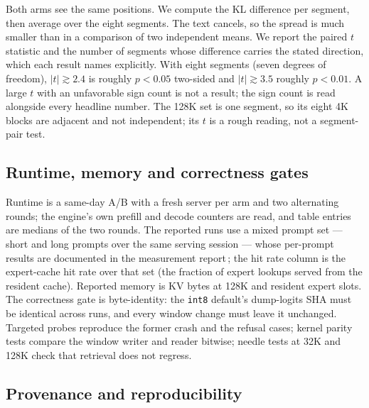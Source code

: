 \documentclass[10pt,twocolumn]{article}
\begin{document}
Both arms see the same positions. We compute the KL difference per segment, then average over the eight segments. The text cancels, so the spread is much smaller than in a comparison of two independent means. We report the paired $t$ statistic and the number of segments whose difference carries the stated direction, which each result names explicitly. With eight segments (seven degrees of freedom), $|t|\gtrsim2.4$ is roughly $p<0.05$ two-sided and $|t|\gtrsim3.5$ roughly $p<0.01$. A large $t$ with an unfavorable sign count is not a result; the sign count is read alongside every headline number. The 128K set is one segment, so its eight 4K blocks are adjacent and not independent; its $t$ is a rough reading, not a segment-pair test.

\subsection{Runtime, memory and correctness gates}

Runtime is a same-day A/B with a fresh server per arm and two alternating rounds; the engine's own prefill and decode counters are read, and table entries are medians of the two rounds. The reported runs use a mixed prompt set --- short and long prompts over the same serving session --- whose per-prompt results are documented in the measurement report\,\cite{strata-wp}; the hit rate column is the expert-cache hit rate over that set (the fraction of expert lookups served from the resident cache). Reported memory is KV bytes at 128K and resident expert slots. The correctness gate is byte-identity: the \texttt{int8} default's dump-logits SHA must be identical across runs, and every window change must leave it unchanged. Targeted probes reproduce the former crash and the refusal cases; kernel parity tests compare the window writer and reader bitwise; needle tests at 32K and 128K check that retrieval does not regress.

\subsection{Provenance and reproducibility}
\end{document}
